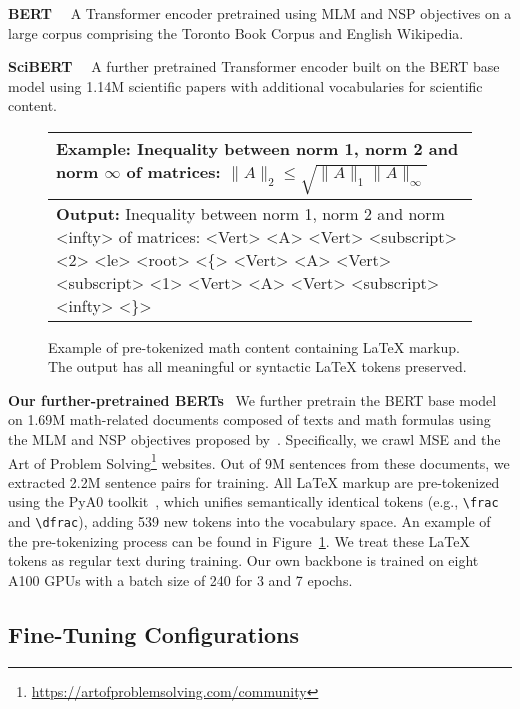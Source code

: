 \documentclass[11pt]{article}
\begin{document}
\smallskip \noindent
\textbf{BERT}~\cite{devlin2019bert} \  A Transformer encoder pretrained using MLM and NSP objectives on a large corpus comprising the Toronto Book Corpus and English Wikipedia.

\smallskip \noindent
\textbf{SciBERT}~\cite{beltagy2019scibert} \  A further pretrained Transformer encoder built on the BERT base model using 1.14M scientific papers with additional vocabularies for scientific content.

\begin{figure}
\small
\centering
\renewcommand{\arraystretch}{1.5}
\begin{tabular}{p{2.9in}}
\toprule
\textbf{Example: } Inequality between norm 1, norm 2 and norm $\infty$ of matrices:
$\|A\|_2 \leq \sqrt{ \|A\|_1 \|A\|_\infty}$
\\ \midrule
\textbf{Output: } Inequality between norm 1, norm 2 and norm <infty> of matrices: <Vert> <A> <Vert> <subscript> <2> <le> <root> <\{> <Vert> <A> <Vert> <subscript> <1> <Vert> <A> <Vert> <subscript> <infty> <\}>
\\ \bottomrule
\end{tabular}
\caption{\label{fig:pretokenize}
Example of pre-tokenized math content containing \LaTeX{} markup.
The output has all meaningful or syntactic \LaTeX{} tokens preserved.}
\end{figure}

\smallskip \noindent
\textbf{Our further-pretrained BERTs} \ 
We further pretrain the BERT base model on 1.69M math-related documents composed of texts and math formulas using the MLM and NSP objectives proposed by~\citet{devlin2019bert}.
Specifically, we crawl MSE and the Art of Problem Solving\footnote{\url{https://artofproblemsolving.com/community}} websites.
Out of 9M sentences from these documents, we extracted 2.2M sentence pairs for training.
All \LaTeX{} markup are pre-tokenized using the PyA0 toolkit~\cite{zhong2021pya0}, which unifies semantically identical tokens (e.g., \texttt{\textbackslash frac} and \texttt{\textbackslash dfrac}), adding 539 new tokens into the vocabulary space.
An example of the pre-tokenizing process can be found in Figure~\ref{fig:pretokenize}.
We treat these \LaTeX{} tokens as regular text during training.
Our own backbone is trained on eight A100 GPUs with a batch size of 240 for 3 and 7 epochs.

\subsection{Fine-Tuning Configurations}
\end{document}
